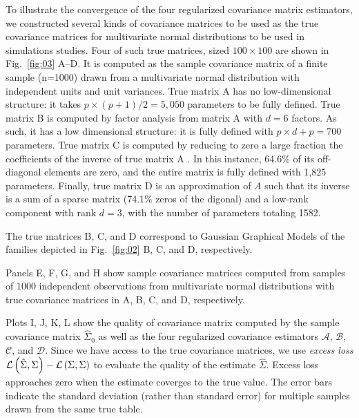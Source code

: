 To illustrate the convergence of the four regularized covariance matrix estimators,  we constructed several kinds of covariance matrices to be used as the true covariance matrices for multivariate normal distributions to be used in simulations studies. Four of such true matrices, sized $100\times100$ are shown in Fig.~\ref{fig:03} A--D.   It is computed as the sample covariance matrix of a finite sample (n=1000) drawn from a multivariate normal distribution with independent units and unit variances.  True matrix A has no low-dimensional structure: it takes $p\times(p+1)/2=5,050$ parameters to be fully defined.  True matrix B is computed by factor analysis from matrix A with $d=6$ factors.  As such, it has a low dimensional structure: it is fully defined with $p\times d +p = 700$ parameters.  True matrix C is computed by reducing to zero a large fraction the coefficients of the inverse of true matrix A . In this instance, 64.6\% of its off-diagonal elements are zero, and the entire matrix is fully defined with 1,825 parameters. Finally, true matrix D is an approximation of $A$ such that its inverse is a sum of a sparse matrix (74.1\% zeros of the digonal) and a low-rank component with rank $d=3$, with the number of parameters totaling 1582.

The true matrices B, C, and D correspond to Gaussian Graphical Models of the families depicted in Fig.~\ref{fig:02} B, C, and D, respectively. 

Panels E, F, G, and H show sample covariance matrices computed from samples of 1000 independent observations from multivariate normal distributions with true covariance matrices in A, B, C, and D, respectively.  

Plots I, J, K, L show the quality of covariance matrix computed by the sample covariance matrix $\hat\Sigma_0$ as well as the four regularized covariance estimators $\mathcal A$, $\mathcal B$, $\mathcal C$, and $\mathcal D$.  Since we have access to the true covariance matrices, we use \emph{excess loss} $\mathcal L\left(\hat\Sigma,\Sigma\right)-\mathcal L\left(\Sigma,\Sigma\right)$ to evaluate the quality of the estimate $\hat\Sigma$. Excess loss approaches zero when the estimate coverges to the true value.  The error bars indicate the standard deviation (rather than standard error) for multiple samples drawn from the same true table.

